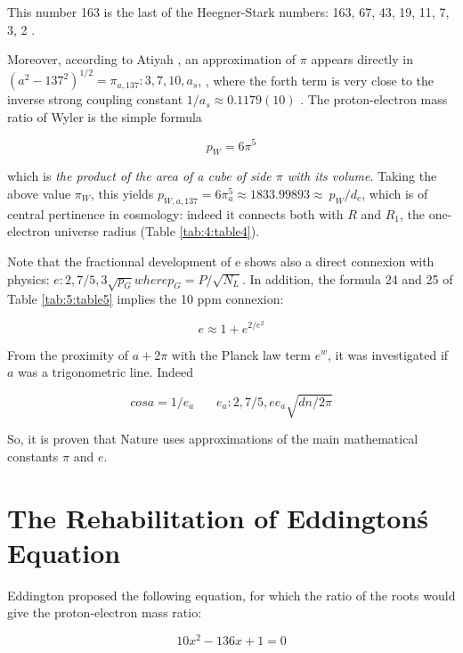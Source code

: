 \documentclass[a4paper,9pt]{article}
\begin{document}
This number 163 is the last of the Heegner-Stark numbers: 163, 67, 43, 19, 11, 7, 3, 2 \cite{Stark}. 


Moreover, according to Atiyah \cite{Atiyah1}, an approximation of $\pi$ appears directly in $(a^2-137^2)^{1/2} = \pi_{a,137} : 3, 7, 10, a_s$, , where the forth term is very close to the inverse strong coupling constant $1/a_s \approx 0.1179(10)$ \cite{Tanabashi}. The proton-electron mass ratio of Wyler \cite{Wyler} is the simple formula 

\begin{equation}
 p_W = 6\pi^5    
\end{equation}

which is \textit {the product of the area of a cube of side $\pi$ with its volume}. Taking the above value $\pi_W$, this yields $p_{W, a, 137} = 6\pi_a^5 \approx 1833.99893 \approx\ p_W/d_e$, which is of central pertinence in cosmology: indeed it connects both with $R$ and $R_1$, the one-electron universe radius \cite{Sanchez} (Table \ref{tab:4:table4}).

Note that the fractionnal development of e shows also a direct connexion with physics: $e : 2, 7/5, 3\sqrt{p_G} where p_G = P/\sqrt {N_L}$. In addition, the formula 24 and 25 of Table \ref{tab:5:table5} implies the 10 ppm connexion:

\begin{equation}
 e \approx 1 + e^{2/e^2}    
\end{equation}

From the proximity of $a + 2\pi$ with the Planck law term $e^w$, it was investigated if $a$ was a trigonometric line. Indeed 
 
\begin{equation}
cosa = 1/e_a ~~~~~~~~  e_a : 2, 7/5, ee_a \sqrt{dn/2\pi} 
\end{equation}

So, it is proven that Nature uses approximations of the main mathematical constants $\pi$ and $e$.








\section{The Rehabilitation of Eddington\'s Equation}
Eddington proposed the following equation, for which the ratio of the roots would give the proton-electron mass ratio:

\begin{equation}
 10x^2 - 136x +1 = 0     
\end{equation}
\end{document}
